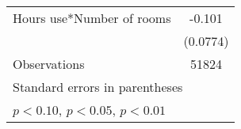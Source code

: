 \begin{table}[htbp]
{\begin{tabular}{l*{1}{c}}
Hours use*Number of rooms&      -0.101         \\
                    &    (0.0774)         \\

\midrule
Observations        &       51824         \\
\bottomrule
\multicolumn{2}{l}{\footnotesize Standard errors in parentheses}\\
\multicolumn{2}{l}{\footnotesize \sym{*} \(p<0.10\), \sym{**} \(p<0.05\), \sym{***} \(p<0.01\)}\\
\end{tabular}}
\end{table}
